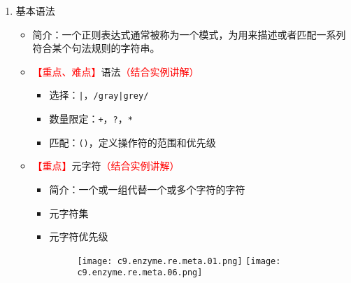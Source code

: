 \documentclass{TIJMUjiaoanLL}
\begin{document}
\begin{enumerate}
\begin{enumerate}
\begin{enumerate}
\begin{itemize}
	    \end{itemize}
	  \item 基本语法
	    \begin{itemize}
	      \item 简介：一个正则表达式通常被称为一个模式，为用来描述或者匹配一系列符合某个句法规则的字符串。
	      \item \textcolor{red}{【重点、难点】}语法\textcolor{red}{（结合实例讲解）}
		\begin{itemize}
		  \item 选择：\verb=|=，\verb=/gray|grey/=
		  \item 数量限定：\verb|+|，\verb|?|，\verb|*|
		  \item 匹配：\verb|()|，定义操作符的范围和优先级
		\end{itemize}
	      \item \textcolor{red}{【重点】}元字符\textcolor{red}{（结合实例讲解）}
		\begin{itemize}
		  \item 简介：一个或一组代替一个或多个字符的字符
		  \item 元字符集
		  \item 元字符优先级
		    \vspace{-1em}
		    \begin{figure}[h]
		        \texttt{[image: c9.enzyme.re.meta.01.png]}
		        \texttt{[image: c9.enzyme.re.meta.06.png]}
		    \end{figure}
		    \vspace{-1em}
		\end{itemize}
	    \end{itemize}
	\end{enumerate}

\otherTail
\newpage
\otherHeader


\end{enumerate}
\end{enumerate}
\end{document}
